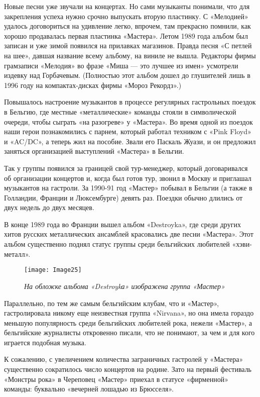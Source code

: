 \documentclass[16pt,a5paper,oneside]{book}
\begin{document}
Новые песни уже звучали на концертах. Но сами музыканты понимали, что для закрепления успеха нужно срочно выпускать
вторую пластинку. С «Мелодией» удалось договориться на удивление легко, впрочем, там прекрасно помнили, как хорошо
продавалась первая пластинка «Мастера». Летом 1989 года альбом был записан и уже зимой появился на прилавках магазинов.
Правда песня «С петлей на шее», давшая название всему альбому, на виниле не вышла. Редакторы фирмы грамзаписи «Мелодия»
во фразе «Миша — это лучшее из имен» усмотрели издевку над Горбачевым. (Полностью этот альбом дошел до глушителей лишь в
1996 году на компактах-дисках фирмы «Мороз Рекордз».)

Повышалось настроение музыкантов в процессе регулярных гастрольных поездок в Бельгию, где местные «металлические»
команды стояли в символической очереди, чтобы сыграть «на разогреве» у «Мастера». Во время одной из поездок наши герои
познакомились с парнем, который работал техником с «Pink Floyd» и «AC/DC», а теперь жил на пособие. Звали его Паскаль
Жуази, и он предложил заняться организацией выступлений «Мастера» в Бельгии.

Так у группы появился за границей свой тур-менеджер, который договаривался об организации концертов и, когда был готов
тур, звонил в Москву и приглашал музыкантов на гастроли. За 1990-91 год «Мастер» побывал в Бельгии (а также в Голландии,
Франции и Люксембурге) девять раз. Поездки обычно длились от двух недель до двух месяцев.

В конце 1989 года во Франции вышел альбом «Destroyka», где среди других хитов русских металлических ансамблей
красовались две песни «Мастера». Этот альбом существенно поднял статус группы среди бельгийских любителей «хэви-металл».

\begin{wrapfigure}{L}{0.5\textwidth}
    \centering
    \texttt{[image: Image25]}
    \caption{\textit{На обложке альбома «Destroykа» изображена группа «Мастер»}}
\end{wrapfigure}

Параллельно, по тем же самым бельгийским клубам, что и «Мастер», гастролировала никому еще неизвестная группа «Nirvana»,
но она имела гораздо меньшую популярность среди бельгийских любителей рока, нежели «Мастер», а бельгийские журналисты
откровенно писали, что не понимают, за чем и для кого играется подобная музыка.

К сожалению, с увеличением количества заграничных гастролей у «Мастера» существенно сократилось число концертов на
родине. Зато на первый фестиваль «Монстры рока» в Череповец «Мастер» приехал в статусе «фирменной» команды: буквально
«вечерней лошадью из Брюсселя».
\end{document}
